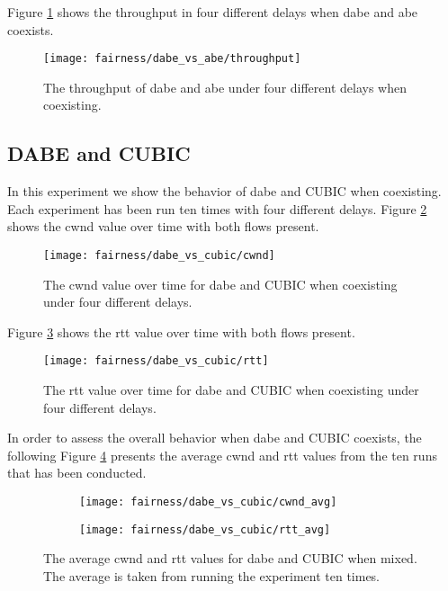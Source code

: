 Figure \ref{fig:dabe_and_abe_throughput} shows the throughput in four different delays when \gls{dabe} and \gls{abe} coexists.

\begin{figure}[H]
    \centering
    \texttt{[image: fairness/dabe\_vs\_abe/throughput]}
    \captionsetup{width=1.0\linewidth}
    \caption{The throughput of \gls{dabe} and \gls{abe} under four different delays when coexisting.}
    \label{fig:dabe_and_abe_throughput}
\end{figure}






\subsection{DABE and CUBIC}

In this experiment we show the behavior of \gls{dabe} and CUBIC when coexisting. Each experiment has been run ten times with four different delays. Figure \ref{fig:dabe_and_cubic_cwnd} shows the \gls{cwnd} value over time with both flows present.

\begin{figure}[H]
    \centering
    \texttt{[image: fairness/dabe\_vs\_cubic/cwnd]}
    \captionsetup{width=1.0\linewidth}
    \caption{The \gls{cwnd} value over time for \gls{dabe} and CUBIC when coexisting under four different delays.}
    \label{fig:dabe_and_cubic_cwnd}
\end{figure}

Figure \ref{fig:dabe_and_cubic_rtt} shows the \gls{rtt} value over time with both flows present.

\begin{figure}[H]
    \centering
    \texttt{[image: fairness/dabe\_vs\_cubic/rtt]}
    \captionsetup{width=1.0\linewidth}
    \caption{The \gls{rtt} value over time for \gls{dabe} and CUBIC when coexisting under four different delays.}
    \label{fig:dabe_and_cubic_rtt}
\end{figure}

In order to assess the overall behavior when \gls{dabe} and CUBIC coexists, the following Figure \ref{fig:dabe_and_cubic_avg} presents the average \gls{cwnd} and \gls{rtt} values from the ten runs that has been conducted.

\begin{figure}[H]
    \centering
    \begin{subfigure}{0.5\linewidth}
        \centering
        \texttt{[image: fairness/dabe\_vs\_cubic/cwnd\_avg]}
    \end{subfigure}%
    \begin{subfigure}{0.5\linewidth}
        \centering
        \texttt{[image: fairness/dabe\_vs\_cubic/rtt\_avg]}
    \end{subfigure}
    \caption{The average \gls{cwnd} and \gls{rtt} values for \gls{dabe} and CUBIC when mixed. The average is taken from running the experiment ten times.}
    \label{fig:dabe_and_cubic_avg}
\end{figure}

